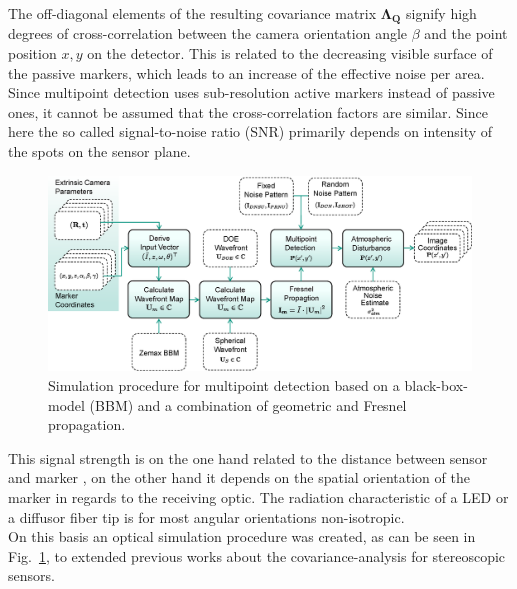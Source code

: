 \documentclass[5p,times,procedia]{elsarticle}
\begin{document}
The off-diagonal elements of the resulting covariance matrix $\mathbf{\Lambda_{Q}}$ signify high degrees of cross-correlation between the camera orientation angle $\beta$ and the point position $x,y$ on the detector. This is related to the decreasing visible surface of the passive markers, which leads to an increase of the effective noise per area.
%
%
Since multipoint detection \cite{Haist2015} uses sub-resolution active markers instead of passive ones, it cannot be assumed that the cross-correlation factors are similar. Since here the so called signal-to-noise ratio (SNR) primarily depends on intensity of the spots on the sensor plane.
%
\begin{figure}[!htb]
	\centering
	\includegraphics[width=1.0\columnwidth]{graphics/OpticalSimulation.eps}
	\caption{Simulation procedure for multipoint detection based on a black-box-model (BBM) and a combination of geometric and Fresnel propagation.}
	\label{fig:opto-sim}
\end{figure}
This signal strength is on the one hand related to the distance between sensor and marker \cite{dumbleton1955}, on the other hand it depends on the spatial orientation of the marker in regards to the receiving optic. The radiation characteristic of a LED or a diffusor fiber tip \cite{Pan1994} is for most angular orientations non-isotropic.\\
%
On this basis an optical simulation procedure was created, as can be seen in Fig.~\ref{fig:opto-sim}, to extended previous works \cite{Liu_2021,Di_Leo_2011} about the covariance-analysis for stereoscopic sensors.\\
\end{document}
